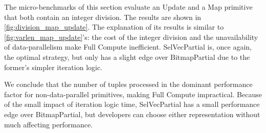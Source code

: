 \documentclass[12pt]{cmuthesis}
\begin{document}
The micro-benchmarks of this section evaluate an Update and a Map primitive that both contain an integer division. The results are shown in \cref{fig:division_map_update}. The explanation of its results is similar to \cref{fig:varlen_map_update}'s: the cost of the integer division and the unavailability of data-parallelism make Full Compute inefficient. SelVecPartial is, once again, the optimal strategy, but only has a slight edge over BitmapPartial due to the former's simpler iteration logic.


We conclude that the number of tuples processed in the dominant performance factor for non-data-parallel primitives, making Full Compute impractical. Because of the small impact of iteration logic time, SelVecPartial has a small performance edge over BitmapPartial, but developers can choose either representation without much affecting performance.
\end{document}
